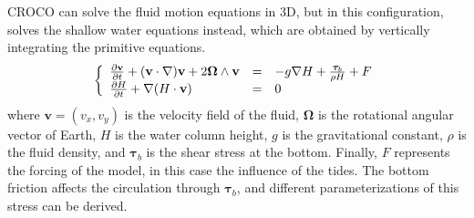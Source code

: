 \documentclass[../../Main_ManuscritThese.tex]{subfiles}
\newcommand{\CROCO}{CROCO}
\begin{document}
\CROCO{} can solve the fluid motion equations in 3D, but in this
configuration, solves the shallow water equations instead, which are
obtained by vertically integrating the primitive equations.
\begin{align}
  \left\{
  \begin{array}{lll}
    \frac{\partial \mathbf{v}}{\partial t} + (\mathbf{v} \cdot \nabla )\mathbf{v} + 2 \bm{\Omega} \wedge \mathbf{v} & = & -g\nabla H + \frac{\bm{\tau}_b}{\rho H} + F \\
    \frac{\partial H}{\partial t} + \nabla (H \cdot \mathbf{v})                                                     & = & 0
  \end{array}
                                                   \right.
\end{align}
where $\mathbf{v} = (v_x,v_y)$ is the velocity field of the fluid,
$\bm{\Omega}$ is the rotational angular vector of Earth, $H$ is the
water column height, $g$ is the gravitational constant, $\rho$ is the
fluid density, and $\bm{\tau}_b$ is the shear stress at the
bottom. Finally, $F$ represents the forcing of the model, in this case
the influence of the tides.  The bottom friction affects the
circulation through $\bm{\tau}_b$, and different parameterizations of
this stress can be derived.
\end{document}
